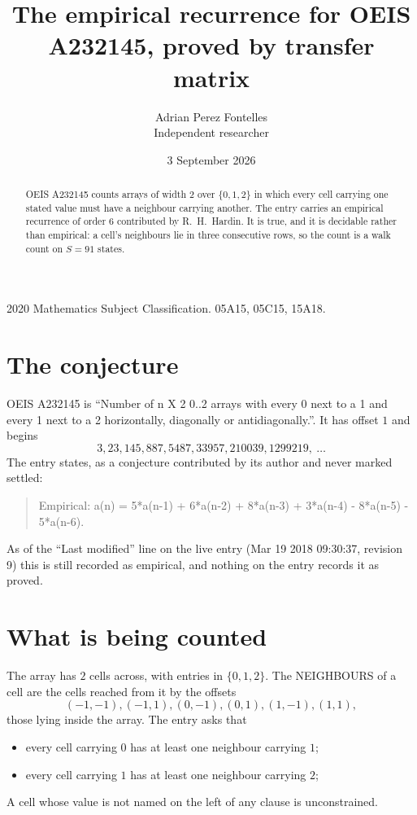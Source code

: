 \documentclass[11pt,a4paper]{article}
\title{The empirical recurrence for OEIS A232145, proved by transfer matrix}
\author{Adrian Perez Fontelles\\ \small Independent researcher}
\date{3 September 2026}
\theoremstyle{plain}
\theoremstyle{definition}
\begin{document}
\maketitle

\begin{abstract}
OEIS A232145 counts arrays of width $2$ over $\{0,1,2\}$ in which every cell carrying one stated
value must have a neighbour carrying another. The entry carries an empirical recurrence of
order $6$ contributed by R.~H.~Hardin. It is true, and it is decidable rather than
empirical: a cell's neighbours lie in three consecutive rows, so the count is a walk count on
$S=91$ states.
\end{abstract}

\noindent\small 2020 Mathematics Subject Classification. 05A15, 05C15, 15A18.\normalsize

\section{The conjecture}

OEIS A232145 is ``Number of n X 2 0..2 arrays with every 0 next to a 1 and every 1 next to a 2 horizontally, diagonally or antidiagonally.''. It has offset $1$ and begins
\[
3, 23, 145, 887, 5487, 33957, 210039, 1299219,\ \dots
\]
The entry states, as a conjecture contributed by its author and never marked settled:
\begin{quote}
Empirical: a(n) = 5*a(n-1) + 6*a(n-2) + 8*a(n-3) + 3*a(n-4) - 8*a(n-5) - 5*a(n-6).
\end{quote}
As of the ``Last modified'' line on the live entry (Mar 19 2018 09:30:37, revision 9) this is still
recorded as empirical, and nothing on the entry records it as proved.

\section{What is being counted}

The array has $2$ cells across, with entries in $\{0,1,2\}$. The NEIGHBOURS of a cell are the
cells reached from it by the offsets
\[
(-1,-1), (-1,1), (0,-1), (0,1), (1,-1), (1,1),
\]
those lying inside the array. The entry asks that
\begin{itemize}
\item every cell carrying $0$ has at least one neighbour carrying $1$;
\item every cell carrying $1$ has at least one neighbour carrying $2$;

\end{itemize}
A cell whose value is not named on the left of any clause is unconstrained.
\end{document}
